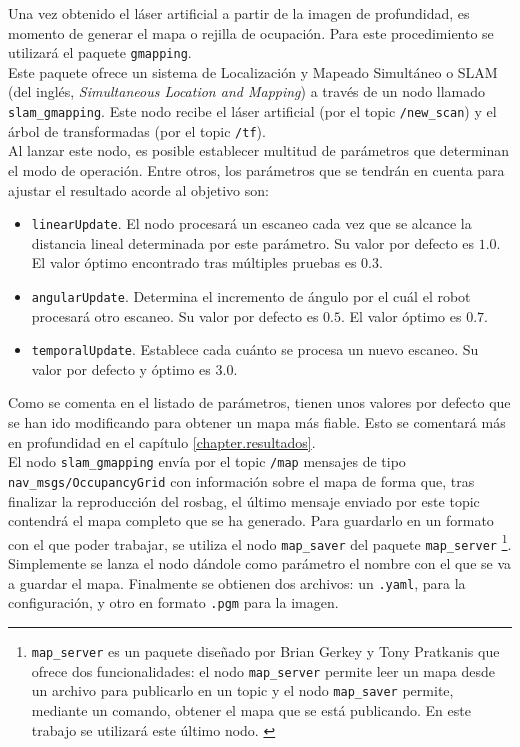 Una vez obtenido el láser artificial a partir de la imagen de profundidad, es momento de generar el mapa o rejilla de ocupación. Para este procedimiento se utilizará el paquete \texttt{gmapping}.\\

Este paquete ofrece un sistema de Localización y Mapeado Simultáneo o SLAM (del inglés, \textit{Simultaneous Location and Mapping}) a través de un nodo llamado \texttt{slam\_gmapping}. Este nodo recibe el láser artificial (por el topic \texttt{/new\_scan}) y el árbol de transformadas (por el topic \texttt{/tf}).\\

Al lanzar este nodo, es posible establecer multitud de parámetros que determinan el modo de operación. Entre otros, los parámetros que se tendrán en cuenta para ajustar el resultado acorde al objetivo son:

\begin{itemize}

	\item \texttt{linearUpdate}. El nodo procesará un escaneo cada vez que se alcance la distancia lineal determinada por este parámetro. Su valor por defecto es $1.0$. El valor óptimo encontrado tras múltiples pruebas es $0.3$.
	\item \texttt{angularUpdate}. Determina el incremento de ángulo por el cuál el robot procesará otro escaneo. Su valor por defecto es $0.5$. El valor óptimo es $0.7$.
	\item \texttt{temporalUpdate}. Establece cada cuánto se procesa un nuevo escaneo. Su valor por defecto y óptimo es $3.0$.

\end{itemize}

Como se comenta en el listado de parámetros, tienen unos valores por defecto que se han ido modificando para obtener un mapa más fiable. Esto se comentará más en profundidad en el capítulo \ref{chapter.resultados}.\\

El nodo \texttt{slam\_gmapping} envía por el topic \texttt{/map} mensajes de tipo \texttt{nav\_msgs\-/OccupancyGrid} con información sobre el mapa de forma que, tras finalizar la reproducción del rosbag, el último mensaje enviado por este topic contendrá el mapa completo que se ha generado. Para guardarlo en un formato con el que poder trabajar, se utiliza el nodo \texttt{map\_saver} del paquete \texttt{map\_server} \footnote{\texttt{map\_server} es un paquete diseñado por Brian Gerkey y Tony Pratkanis que ofrece dos funcionalidades: el nodo \texttt{map\_server} permite leer un mapa desde un archivo para publicarlo en un topic y el nodo \texttt{map\_saver} permite, mediante un comando, obtener el mapa que se está publicando. En este trabajo se utilizará este último nodo. \cite{mapserver}}. Simplemente se lanza el nodo dándole como parámetro el nombre con el que se va a guardar el mapa. Finalmente se obtienen dos archivos: un \texttt{.yaml}, para la configuración, y otro en formato \texttt{.pgm} para la imagen.\\

